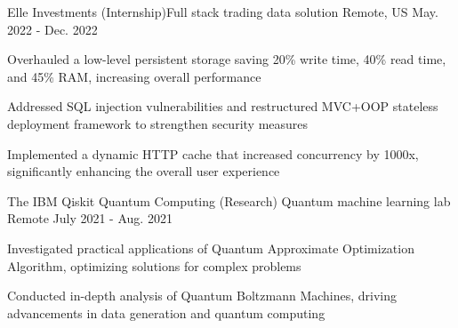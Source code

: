 \begin{cventries}
  \begin{comment}
  \cventry
    {Machine Learning \& Computation}
    {Chemical Molecular Energy Optimization}
    {Providence, RI}
    {Aug 2022 - Present}
    {
      \begin{cvitems}
        \item {Analyzed traditional Hartree-Fock and DFT methods with Gaussian}
        \item {Implemented the original data pipeline on Brown's Oscar super computing cluster with 200x speed}
        \item {Working on an efficient Belief Propagation network based on HMC}
      \end{cvitems}
    }
  \end{comment}

  \cventry
    {Elle Investments}
    {(Internship)Full stack trading data solution}
    {Remote, US}
    {May. 2022 - Dec. 2022}
    {
      \begin{cvitems}
          \item {Overhauled a low-level persistent storage saving 20\% write time, 40\% read time, and 45\% RAM, increasing overall performance}
          \item {Addressed SQL injection vulnerabilities and restructured MVC+OOP stateless deployment framework to strengthen security measures}
          \item {Implemented a dynamic HTTP cache that increased concurrency by 1000x, significantly enhancing the overall user experience}
      \end{cvitems}
    }

  \cventry
    {The IBM Qiskit Quantum Computing}
    {(Research) Quantum machine learning lab}
    {Remote}
    {July 2021 - Aug. 2021}
    {
      \begin{cvitems}
        \item {Investigated practical applications of Quantum Approximate Optimization Algorithm, optimizing solutions for complex problems}
        \item {Conducted in-depth analysis of Quantum Boltzmann Machines, driving advancements in data generation and quantum computing}
      \end{cvitems}
    }


\end{cventries}
